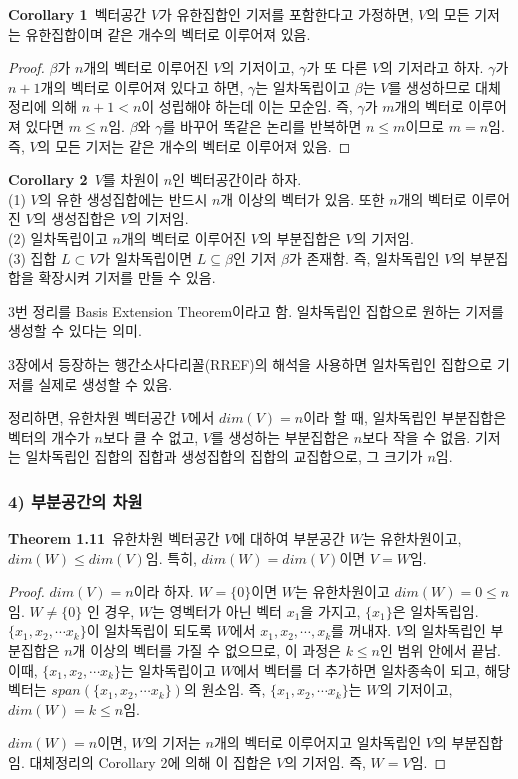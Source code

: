 \textbf{Corollary 1}\, 벡터공간 $V$가 유한집합인 기저를 포함한다고 가정하면, $V$의 모든 기저는 유한집합이며 같은 개수의 벡터로 이루어져 있음.

\begin{proof}
$\beta$가 $n$개의 벡터로 이루어진 $V$의 기저이고, $\gamma$가 또 다른 $V$의 기저라고 하자. $\gamma$가 $n+1$개의 벡터로 이루어져 있다고 하면, $\gamma$는 일차독립이고 $\beta$는 $V$를 생성하므로 대체정리에 의해 $n+1 < n$이 성립해야 하는데 이는 모순임. 즉, $\gamma$가 $m$개의 벡터로 이루어져 있다면 $m \leq n$임. $\beta$와 $\gamma$를 바꾸어 똑같은 논리를 반복하면 $n \leq m$이므로 $m=n$임. 즉, $V$의 모든 기저는 같은 개수의 벡터로 이루어져 있음.
\end{proof}

\textbf{Corollary 2}\, $V$를 차원이 $n$인 벡터공간이라 하자.\\
(1) $V$의 유한 생성집합에는 반드시 $n$개 이상의 벡터가 있음. 또한 $n$개의 벡터로 이루어진 $V$의 생성집합은 $V$의 기저임.\\
(2) 일차독립이고 $n$개의 벡터로 이루어진 $V$의 부분집합은 $V$의 기저임.\\
(3) 집합 $L \subset V$가 일차독립이면 $L \subseteq \beta$인 기저 $\beta$가 존재함. 즉, 일차독립인 $V$의 부분집합을 확장시켜 기저를 만들 수 있음.

3번 정리를 Basis Extension Theorem이라고 함. 일차독립인 집합으로 원하는 기저를 생성할 수 있다는 의미.

3장에서 등장하는 행간소사다리꼴(RREF)의 해석을 사용하면 일차독립인 집합으로 기저를 실제로 생성할 수 있음.

정리하면, 유한차원 벡터공간 $V$에서 $dim(V)=n$이라 할 때, 일차독립인 부분집합은 벡터의 개수가 $n$보다 클 수 없고, $V$를 생성하는 부분집합은 $n$보다 작을 수 없음. 기저는 일차독립인 집합의 집합과 생성집합의 집합의 교집합으로, 그 크기가 $n$임.


\newpage


\subsubsection*{4) 부분공간의 차원}
\textbf{Theorem 1.11}\, 유한차원 벡터공간 $V$에 대하여 부분공간 $W$는 유한차원이고, $dim(W) \leq dim(V)$임. 특히, $dim(W) = dim(V)$이면 $V=W$임.

\begin{proof}
$dim(V)=n$이라 하자. $W=\{0\}$이면 $W$는 유한차원이고 $dim(W)=0 \leq n$임. $W \neq \{0\}$ 인 경우, $W$는 영벡터가 아닌 벡터 $x_1$을 가지고, $\{x_1\}$은 일차독립임. $\{x_1,x_2, \cdots x_k\}$이 일차독립이 되도록 $W$에서 $x_1,x_2, \cdots ,x_k$를 꺼내자. $V$의 일차독립인 부분집합은 $n$개 이상의 벡터를 가질 수 없으므로, 이 과정은 $k \leq n$인 범위 안에서 끝남. 이때, $\{x_1,x_2, \cdots x_k\}$는 일차독립이고 $W$에서 벡터를 더 추가하면 일차종속이 되고, 해당 벡터는 $span(\{x_1,x_2, \cdots x_k\})$의 원소임. 즉, $\{x_1,x_2, \cdots x_k\}$는 $W$의 기저이고, $dim(W)=k \leq n$임.

$dim(W)=n$이면, $W$의 기저는 $n$개의 벡터로 이루어지고 일차독립인 $V$의 부분집합임. 대체정리의 Corollary 2에 의해 이 집합은 $V$의 기저임. 즉, $W=V$임.
\end{proof}

